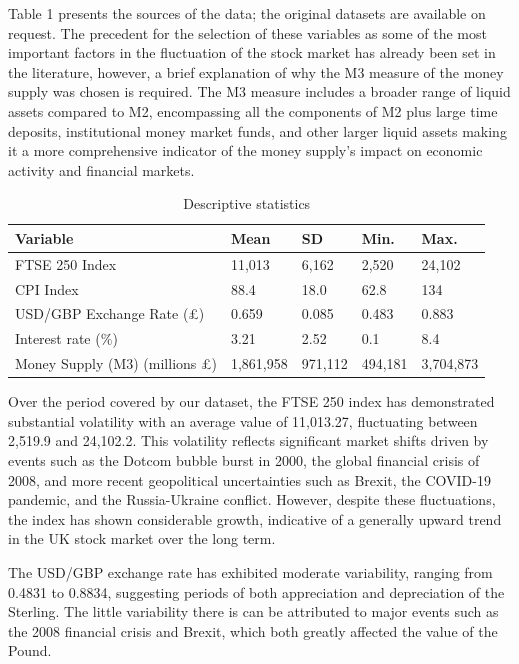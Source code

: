 \documentclass[12pt,a4paper]{article}
\begin{document}
Table 1 presents the sources of the data; the original datasets are available on request. 
The precedent for the selection of these variables as some of the most important 
factors in the fluctuation of the stock market has already been set in the literature, however, 
a brief explanation of why the M3 measure of the money supply was chosen is 
required. The M3 measure includes a broader range of liquid assets 
compared to M2, encompassing all the components of M2 plus large time 
deposits, institutional money market funds, and other larger liquid assets
making it a more comprehensive indicator of the money supply's impact on economic activity and financial markets.

\begin{table}[h!]
    \centering
    \caption{Descriptive statistics}
    \begin{tabular}{lllll}
        \toprule
        \textbf{Variable} & \textbf{Mean} & \textbf{SD} &  \textbf{Min.} & \textbf{Max.}\\
        \midrule
        FTSE 250 Index &  11,013 & 6,162 & 2,520 & 24,102 \\
        CPI Index &  88.4 & 18.0 & 62.8 & 134 \\
        USD/GBP Exchange Rate (£) &  0.659 & 0.085 & 0.483 & 0.883 \\
        Interest rate ($\%$) &  3.21 & 2.52 & 0.1 & 8.4 \\
        Money Supply (M3) (millions £) &  1,861,958 & 971,112 & 494,181 & 3,704,873 \\
        \bottomrule
    \end{tabular}
\end{table}

Over the period covered by our dataset, the FTSE 250 index has demonstrated substantial volatility with an average value of 11,013.27, fluctuating between 2,519.9 and 24,102.2. 
This volatility reflects significant market shifts driven by events such as the 
Dotcom bubble burst in 2000, the global financial crisis of 2008, and more recent geopolitical uncertainties such as Brexit, the COVID-19 pandemic, and the Russia-Ukraine conflict. However, 
despite these fluctuations, the index has shown considerable growth, 
indicative of a generally upward trend in the UK stock market over the 
long term.

The USD/GBP exchange rate has exhibited moderate variability, 
ranging from 0.4831 to 0.8834, suggesting periods of both 
appreciation and depreciation of the Sterling. The little variability 
there is can be
attributed to major events such as the 2008 financial crisis and Brexit, 
which both greatly affected the value of the Pound. 
\end{document}
